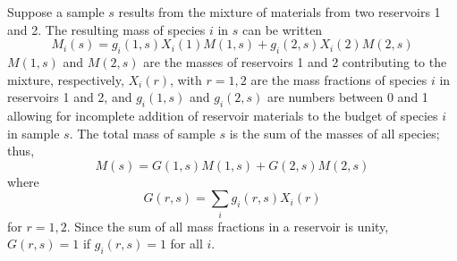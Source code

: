 \documentclass[preprint]{revtex4-2}
\begin{document}
Suppose a sample $s$ results from the mixture of materials from two reservoirs
1 and 2.  The resulting mass of species $i$ in $s$ can be written
\begin{equation}
M_i(s) = g_i(1, s) X_i(1) M(1, s) + g_i(2, s) X_i(2) M(2, s)
\label{eq:mix1}
\end{equation}
$M(1, s)$ and $M(2, s)$ are the masses of reservoirs 1 and 2 contributing to the
mixture, respectively, $X_i(r)$, with $r = 1,2$ are the mass fractions
of species $i$ in reservoirs 1 and 2, and $g_i(1, s)$ and $g_i(2, s)$ are
numbers
between 0 and 1 allowing for incomplete addition of reservoir materials to
the budget of species $i$ in sample $s$.  The total mass of sample $s$ is
the sum of the masses of all species; thus,
\begin{equation}
M(s) = G(1, s) M(1, s) + G(2, s) M(2, s)
\label{eq:mix2}
\end{equation}
where
\begin{equation}
G(r, s) = \sum_i g_i(r, s) X_i(r)
\label{eq:G}
\end{equation}
for $r = 1, 2$.  Since the sum of all mass fractions in a reservoir is
unity, $G(r, s) = 1$ if $g_i(r, s) = 1$ for all $i$.
\end{document}
